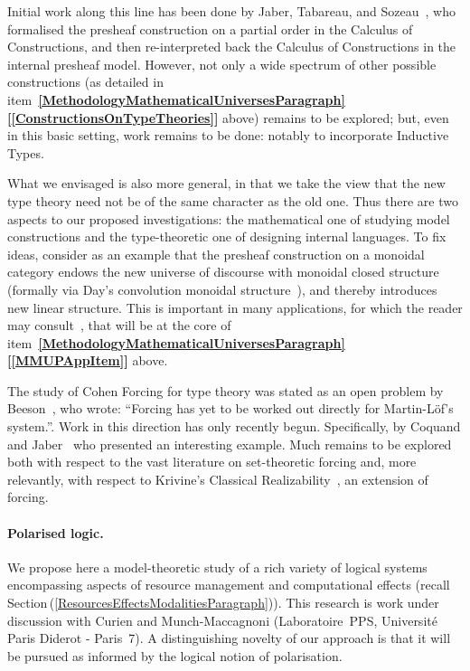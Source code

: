\documentclass[11pt,twocolumn]{article}
\newcommand{\pref}[1]{\,(\ref{#1})}
\newcommand{\itemref}[1]{\textbf{[\ref{#1}]}}
\begin{document}
Initial work along this line has been done by Jaber, Tabareau, and
Sozeau~\cite{TypeTheoryWithForcing}, who formalised the presheaf
construction on a partial order in the Calculus of Constructions, and then
re-interpreted back the Calculus of Constructions in the internal presheaf
model.  However, not only a wide spectrum of other possible constructions
(as detailed in
item~\textbf{\ref{MethodologyMathematicalUniversesParagraph}}\thinspace\itemref{ConstructionsOnTypeTheories}
above) remains to be explored; but, even in this basic setting, work remains
to be done: notably to incorporate Inductive Types.

What we envisaged is also more general, in that we take the view that the
new type theory need not be of the same character as the old one.  Thus
there are two aspects to our proposed investigations: the mathematical one
of studying model constructions and the type-theoretic one of designing
internal languages.  To fix ideas, consider as an example that the
presheaf construction on a monoidal category endows the new universe of
discourse with monoidal closed structure (formally via Day's convolution
monoidal structure~\cite{Day}), and thereby introduces new linear structure.
This is important in many applications, for which the reader may
consult~\cite{FioreFossacs}, %
that will be at the core of
item~\mbox{\textbf{\ref{MethodologyMathematicalUniversesParagraph}}\thinspace\textbf{\itemref{MMUPAppItem}}}
above.

The study of Cohen Forcing for type theory was stated as an open problem
by Beeson~\cite{BeesonBook}, who wrote: ``Forcing has yet to be worked out
directly for Martin-L\"of's system.''.  Work in this direction has only
recently begun.  Specifically, by Coquand and Jaber~\cite{CoquandNote} who
presented an interesting example.  Much remains to be explored both with
respect to the vast literature on set-theoretic forcing and, more
relevantly, with respect to Krivine's Classical
Realizability~\cite{KrivineRA}, an extension of forcing.

\paragraph{Polarised logic.}
\label{PolarisationParagraph}

We propose here a model-theoretic study of a rich variety of logical
systems encompassing aspects of resource management and computational
effects (recall Section\pref{ResourcesEffectsModalitiesParagraph}).  This
research is work under discussion with Curien and
Munch-Maccagnoni (Laboratoire~PPS, Universit\'e Paris Diderot - Paris~7).
A distinguishing novelty of our approach is that it will be pursued as
informed by the logical notion of polarisation.
\end{document}
